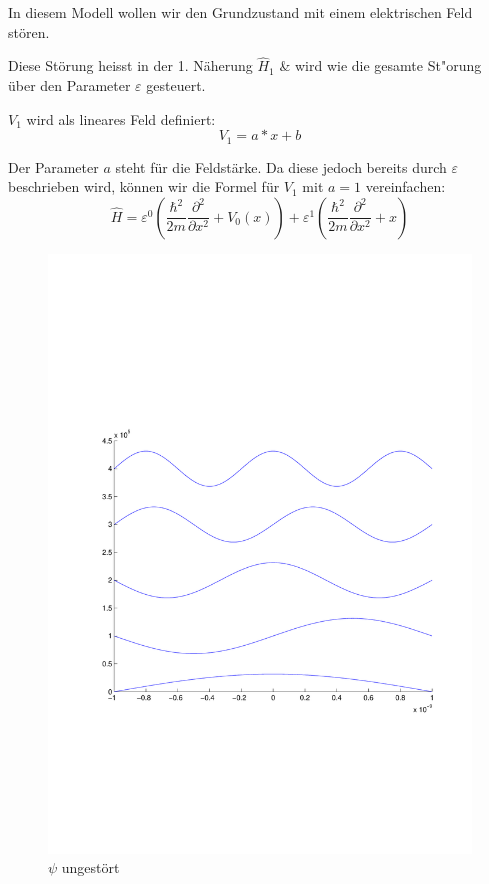 \begin{refsection}
In diesem Modell wollen wir den Grundzustand mit einem elektrischen Feld st\"oren.

Diese St\"orung heisst in der 1. N\"aherung $\hat H_1$ \& wird wie die gesamte St"orung \"uber den Parameter $\varepsilon$ gesteuert.

$V_1$ wird als lineares Feld definiert:
\[
  V_1 = a*x + b
\]

Der Parameter $a$ steht f\"ur die Feldst\"arke. Da diese jedoch bereits durch 
$\varepsilon$ beschrieben wird, k\"onnen wir die Formel f\"ur $V_1$ mit $a = 1$ vereinfachen:
\[
  \hat{H} = \varepsilon^0 ( \frac{\hbar^2}{2m} \frac{\partial^2}{\partial x^2} + V_0(x) )
            + \varepsilon^1 ( \frac{\hbar^2}{2m} \frac{\partial^2}{\partial x^2} + x )
\]


\begin{figure}
 \centering
 \includegraphics[width=12cm,clip=true,trim=2cm 7cm 1cm 8cm]{efeld/Psi_ungestoert.pdf}
 \caption{$\psi$ ungest\"ort}
 \label{abb:efeld_psi_ungestoert}
\end{figure}






\end{refsection}
